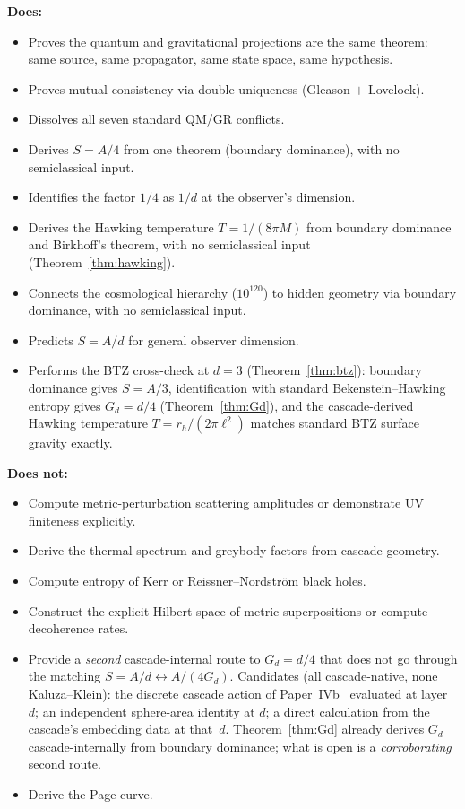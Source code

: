 \documentclass[12pt,a4paper]{article}
\begin{document}
\textbf{Does:}
\begin{itemize}
\item Proves the quantum and gravitational projections are the same theorem:
same source, same propagator, same state space, same hypothesis.
\item Proves mutual consistency via double uniqueness (Gleason $+$ Lovelock).
\item Dissolves all seven standard QM/GR conflicts.
\item Derives $S = A/4$ from one theorem (boundary dominance), with no
semiclassical input.
\item Identifies the factor $1/4$ as $1/d$ at the observer's dimension.
\item Derives the Hawking temperature $T = 1/(8\pi M)$ from boundary
dominance and Birkhoff's theorem, with no semiclassical input
(Theorem~\ref{thm:hawking}).
\item Connects the cosmological hierarchy ($10^{120}$) to hidden geometry
via boundary dominance, with no semiclassical input.
\item Predicts $S = A/d$ for general observer dimension.
\item Performs the BTZ cross-check at $d = 3$ (Theorem~\ref{thm:btz}):
boundary dominance gives $S = A/3$, identification with standard
Bekenstein--Hawking entropy gives $G_d = d/4$ (Theorem~\ref{thm:Gd}),
and the cascade-derived Hawking temperature $T = r_h/(2\pi\ell^2)$
matches standard BTZ surface gravity exactly.
\end{itemize}

\textbf{Does not:}
\begin{itemize}
\item Compute metric-perturbation scattering amplitudes or demonstrate UV finiteness explicitly.
\item Derive the thermal spectrum and greybody factors from cascade geometry.
\item Compute entropy of Kerr or Reissner--Nordstr\"{o}m black holes.
\item Construct the explicit Hilbert space of metric superpositions or
compute decoherence rates.
\item Provide a \emph{second} cascade-internal route to
$G_d = d/4$ that does not go through the matching $S = A/d
\leftrightarrow A/(4G_d)$. Candidates (all cascade-native, none
Kaluza--Klein): the discrete cascade action of Paper~IVb~\cite{part4b}
evaluated at layer~$d$; an independent sphere-area identity at $d$;
a direct calculation from the cascade's embedding data at that~$d$.
Theorem~\ref{thm:Gd} already derives $G_d$ cascade-internally from
boundary dominance; what is open is a \emph{corroborating} second route.
\item Derive the Page curve.
\end{itemize}
\end{document}

